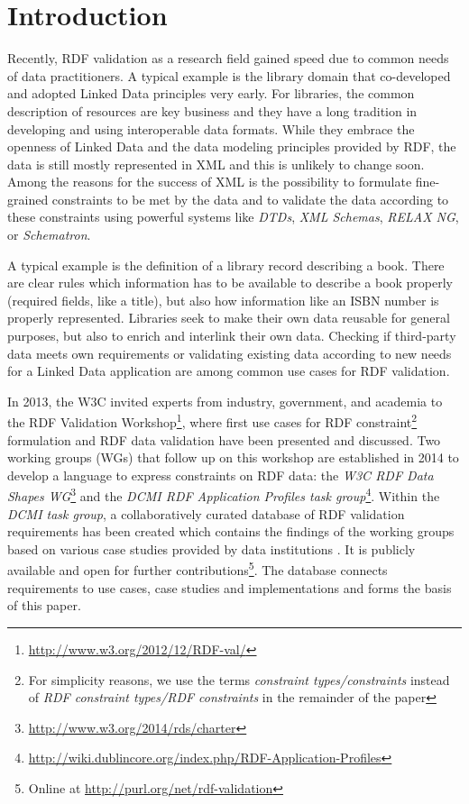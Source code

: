 \documentclass{acm_proc_article-sp}
\begin{document}

\section{Introduction}
\label{introduction}

Recently, RDF validation as a research field gained speed due to common needs of data practitioners. A typical example is the library domain that co-developed and adopted Linked Data principles very early. For libraries, the common description of resources are key business and they have a long tradition in developing and using interoperable data formats. While they embrace the openness of Linked Data and the data modeling principles provided by RDF, the data is still mostly represented in XML and this is unlikely to change soon. 
Among the reasons for the success of XML is the possibility to formulate fine-grained constraints to be met by the data and to validate the data according to these constraints using powerful systems like \emph{DTDs}, \emph{XML Schemas}, \emph{RELAX NG}, or \emph{Schematron}.

A typical example is the definition of a library record describing a book. There are clear rules which information has to be available to describe a book properly (required fields, like a title), but also how information like an ISBN number is properly represented. Libraries seek to make their own data reusable for general purposes, but also to enrich and interlink their own data. Checking if third-party data meets own requirements or validating existing data according to new needs for a Linked Data application are among common use cases for RDF validation.

 In 2013, the W3C invited experts from industry, government, and academia to the RDF Validation Workshop\footnote{\url{http://www.w3.org/2012/12/RDF-val/}}, 
where first use cases for RDF constraint\footnote{For simplicity reasons, we use the terms \emph{constraint types/constraints} instead of \emph{RDF constraint types/RDF constraints} in the remainder of the paper} formulation and RDF data validation have been presented and discussed. 
Two working groups (WGs) that follow up on this workshop are established in 2014 to develop a language to express constraints on RDF data: 
the \emph{W3C RDF Data Shapes WG}\footnote{\url{http://www.w3.org/2014/rds/charter}} and the \emph{DCMI RDF Application Profiles task group}\footnote{\url{http://wiki.dublincore.org/index.php/RDF-Application-Profiles}}. 
Within the \emph{DCMI task group}, a collaboratively curated database of RDF validation requirements has been created which contains the findings of the working groups based on various case studies provided by data institutions \cite{BoschEckert2014}. It is publicly available and open for further contributions\footnote{Online at \url{http://purl.org/net/rdf-validation}}.
The database connects requirements to use cases, case studies and implementations and forms the basis of this paper. 
\end{document}

